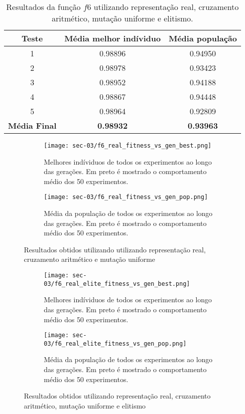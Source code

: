 \begin{table}[htb]
	\centering
	\begin{tabular}{|c|c|c|}
		\hline
		\rowcolor[HTML]{9B9B9B}
		Teste & Média melhor indíviduo & Média população \\\hline
		1 & 0.98896 & 0.94950 \\\hline
		2 & 0.98978 & 0.93423 \\\hline
		3 & 0.98952 & 0.94188 \\\hline
		4 & 0.98867 & 0.94448 \\\hline
		5 & 0.98964 & 0.92809 \\\hline
		\textbf{Média Final} & \textbf{0.98932} & \textbf{0.93963} \\\hline	\end{tabular}
    \caption{Resultados da função $f6$ utilizando representação real, cruzamento aritmético,
    mutação uniforme e elitismo. \label{tab:f6_real_elite}}
\end{table}

\begin{figure}[htb]
	\begin{subfigure}{.45\textwidth}
		\centering
		\texttt{[image: sec-03/f6\_real\_fitness\_vs\_gen\_best.png]}
		\caption{Melhores indíviduos de todos os experimentos ao longo das gerações.
		Em preto é mostrado o comportamento médio dos 50 experimentos. }
	\end{subfigure}
	\hfill
	\begin{subfigure}{.45\textwidth}
		\centering
		\texttt{[image: sec-03/f6\_real\_fitness\_vs\_gen\_pop.png]}
		\caption{Média da população de todos os experimentos ao longo das gerações.
		Em preto é mostrado o comportamento médio dos 50 experimentos.}
	\end{subfigure}
	\caption{Resultados obtidos utilizando utilizando representação real, cruzamento aritmético e
    mutação uniforme}
\end{figure}


	\begin{figure}[htb]
	\begin{subfigure}{.45\textwidth}
		\centering
		\texttt{[image: sec-03/f6\_real\_elite\_fitness\_vs\_gen\_best.png]}
		\caption{Melhores indíviduos de todos os experimentos ao longo das gerações.
		Em preto é mostrado o comportamento médio dos 50 experimentos. }
	\end{subfigure}
	\hfill
	\begin{subfigure}{.45\textwidth}
		\centering
		\texttt{[image: sec-03/f6\_real\_elite\_fitness\_vs\_gen\_pop.png]}
		\caption{Média da população de todos os experimentos ao longo das gerações.
		Em preto é mostrado o comportamento médio dos 50 experimentos.}
	\end{subfigure}
	\caption{Resultados obtidos utilizando representação real, cruzamento aritmético,
    mutação uniforme e elitismo}
\end{figure}